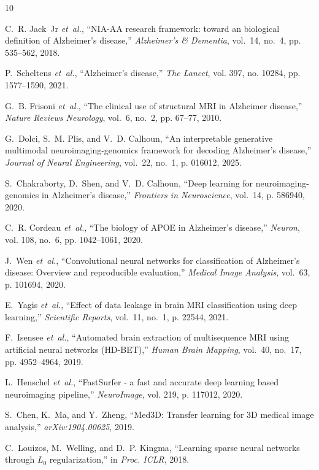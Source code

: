 \documentclass[journal,twocolumn]{IEEEtran}
\begin{document}

\begin{thebibliography}{10}

C.~R. Jack~Jr \emph{et~al.}, ``{NIA-AA} research framework: toward an biological definition of {Alzheimer's} disease,'' \emph{Alzheimer's \& Dementia}, vol.~14, no.~4, pp. 535--562, 2018.

P.~Scheltens \emph{et~al.}, ``Alzheimer's disease,'' \emph{The Lancet}, vol. 397, no. 10284, pp. 1577--1590, 2021.

G.~B. Frisoni \emph{et~al.}, ``The clinical use of structural {MRI} in {Alzheimer} disease,'' \emph{Nature Reviews Neurology}, vol.~6, no.~2, pp. 67--77, 2010.

G.~Dolci, S.~M. Plis, and V.~D. Calhoun, ``An interpretable generative multimodal neuroimaging-genomics framework for decoding {Alzheimer's} disease,'' \emph{Journal of Neural Engineering}, vol.~22, no.~1, p. 016012, 2025.

S.~Chakraborty, D.~Shen, and V.~D. Calhoun, ``Deep learning for neuroimaging-genomics in {Alzheimer's} disease,'' \emph{Frontiers in Neuroscience}, vol.~14, p. 586940, 2020.

C.~R. Cordeau \emph{et~al.}, ``The biology of {APOE} in {Alzheimer's} disease,'' \emph{Neuron}, vol. 108, no.~6, pp. 1042--1061, 2020.

J.~Wen \emph{et~al.}, ``Convolutional neural networks for classification of {Alzheimer's} disease: Overview and reproducible evaluation,'' \emph{Medical Image Analysis}, vol.~63, p. 101694, 2020.

E.~Yagis \emph{et~al.}, ``Effect of data leakage in brain {MRI} classification using deep learning,'' \emph{Scientific Reports}, vol.~11, no.~1, p. 22544, 2021.

F.~Isensee \emph{et~al.}, ``Automated brain extraction of multisequence {MRI} using artificial neural networks ({HD-BET}),'' \emph{Human Brain Mapping}, vol.~40, no.~17, pp. 4952--4964, 2019.

L.~Henschel \emph{et~al.}, ``{FastSurfer} - a fast and accurate deep learning based neuroimaging pipeline,'' \emph{NeuroImage}, vol. 219, p. 117012, 2020.

S.~Chen, K.~Ma, and Y.~Zheng, ``{Med3D}: Transfer learning for {3D} medical image analysis,'' \emph{arXiv:1904.00625}, 2019.

C.~Louizos, M.~Welling, and D.~P. Kingma, ``Learning sparse neural networks through $L_0$ regularization,'' in \emph{Proc. ICLR}, 2018.

\end{thebibliography}
\end{document}
